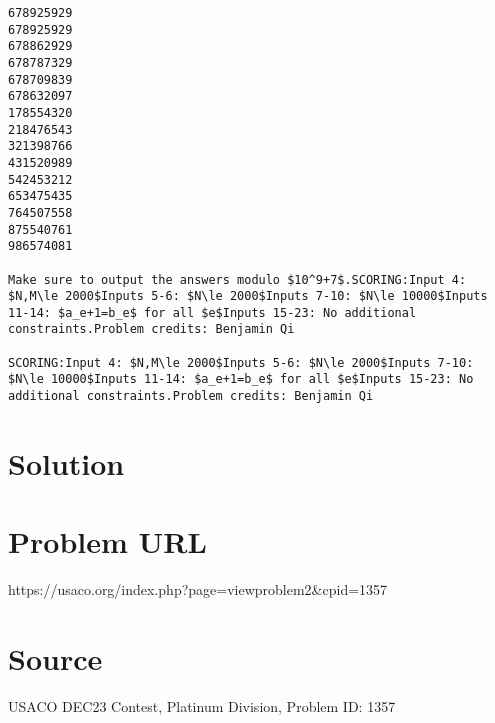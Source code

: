 \documentclass[12pt]{article}
\begin{document}
\begin{verbatim}
678925929
678925929
678862929
678787329
678709839
678632097
178554320
218476543
321398766
431520989
542453212
653475435
764507558
875540761
986574081

Make sure to output the answers modulo $10^9+7$.SCORING:Input 4: $N,M\le 2000$Inputs 5-6: $N\le 2000$Inputs 7-10: $N\le 10000$Inputs 11-14: $a_e+1=b_e$ for all $e$Inputs 15-23: No additional constraints.Problem credits: Benjamin Qi

SCORING:Input 4: $N,M\le 2000$Inputs 5-6: $N\le 2000$Inputs 7-10: $N\le 10000$Inputs 11-14: $a_e+1=b_e$ for all $e$Inputs 15-23: No additional constraints.Problem credits: Benjamin Qi
\end{verbatim}

\section*{Solution}


\section*{Problem URL}
https://usaco.org/index.php?page=viewproblem2&cpid=1357

\section*{Source}
USACO DEC23 Contest, Platinum Division, Problem ID: 1357
\end{document}
